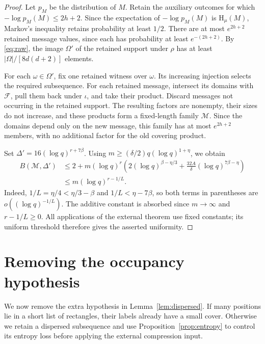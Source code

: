 \documentclass[11pt,a4paper]{article}
\numberwithin{equation}{section}
\newcommand{\HH}{\mathrm H}
\begin{document}
\begin{proof}
Let $p_M$ be the distribution of $M$.
Retain the auxiliary outcomes for which
$-\log p_M(M)\le2h+2$.
Since the expectation of $-\log p_M(M)$ is $\HH_\mu(M)$,
Markov's inequality retains probability at least $1/2$.
There are at most $e^{2h+2}$ retained message values, since each
has probability at least $e^{-(2h+2)}$.
By \eqref{eq:raw}, the image $\Omega'$ of the retained support
under $\rho$ has at least $|\Omega|/[8d(d+2)]$ elements.

For each $\omega\in\Omega'$, fix one retained witness over
$\omega$. Its increasing injection selects the required
subsequence. For each retained message, intersect its domains
with $\mathcal F$, pull them back under $\iota$, and take their
product. Discard messages not occurring in the retained support.
The resulting factors are nonempty, their sizes do not increase,
and these products form a fixed-length family $\mathcal M$.
Since the domains depend only on the new message, this family
has at most $e^{2h+2}$ members, with no additional factor for the
old covering product.

Set $\Delta'=16(\log q)^{r+7\beta}$.
Using $m\ge(\delta/2)q(\log q)^{1+\eta}$, we obtain
\begin{align*}
 B(\mathcal M,\Delta')
 &\le2+m(\log q)^r\left(
       2(\log q)^{\beta-\eta/3}
       +\frac{32A}{\delta}(\log q)^{7\beta-\eta}\right)\\
 &\le m(\log q)^{r-1/L}.
\end{align*}
Indeed, $1/L=\eta/4<\eta/3-\beta$ and
$1/L<\eta-7\beta$, so both terms in parentheses are
$o((\log q)^{-1/L})$.
The additive constant is absorbed since $m\to\infty$ and
$r-1/L\ge0$.
All applications of the external theorem use fixed constants;
its uniform threshold therefore gives the asserted uniformity.
\end{proof}

\section{Removing the occupancy hypothesis}\label{sec:reduction}

We now remove the extra hypothesis in Lemma~\ref{lem:dispersed}.
If many positions lie in a short list of rectangles, their labels
already have a small cover. Otherwise we retain a dispersed
subsequence and use Proposition~\ref{prop:entropy} to control its
entropy loss before applying the external compression input.
\end{document}
